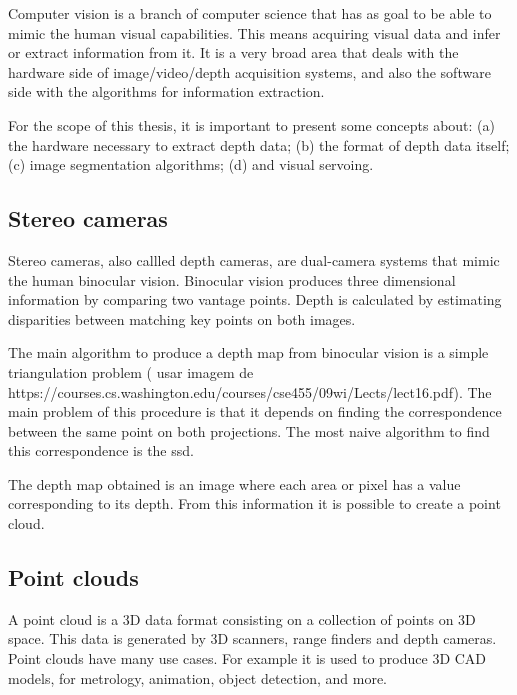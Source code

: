 Computer vision is a branch of computer science that has as goal to be able to mimic the human visual capabilities. This means acquiring visual data and infer or extract information from it. It is a very broad area that deals with the hardware side of image/video/depth acquisition systems, and also the software side with the algorithms for information extraction.

For the scope of this thesis, it is important to present some concepts about: (a) the hardware necessary to extract depth data; (b) the format of depth data itself; (c) image segmentation algorithms; (d) and visual servoing.

\subsection{Stereo cameras}
\label{subsec:stereo_cameras}

Stereo cameras, also callled depth cameras, are dual-camera systems that mimic the human binocular vision. Binocular vision produces three dimensional information by comparing two vantage points. Depth is calculated by estimating disparities between matching key points on both images.

The main algorithm to produce a depth map from binocular vision is a simple triangulation problem ({\color{red} usar imagem de https://courses.cs.washington.edu/courses/cse455/09wi/Lects/lect16.pdf}). The main problem of this procedure is that it depends on finding the correspondence between the same point on both projections. The most naive algorithm to find this correspondence is the \gls{ssd}.

The depth map obtained is an image where each area or pixel has a value corresponding to its depth. From this information it is possible to create a point cloud.


\subsection{Point clouds}
\label{subsec:point_clouds}

A point cloud is a 3D data format consisting on a collection of points on 3D space. This data is generated by 3D scanners, range finders and depth cameras. Point clouds have many use cases. For example it is used to produce 3D CAD models, for metrology, animation, object detection, and more.


